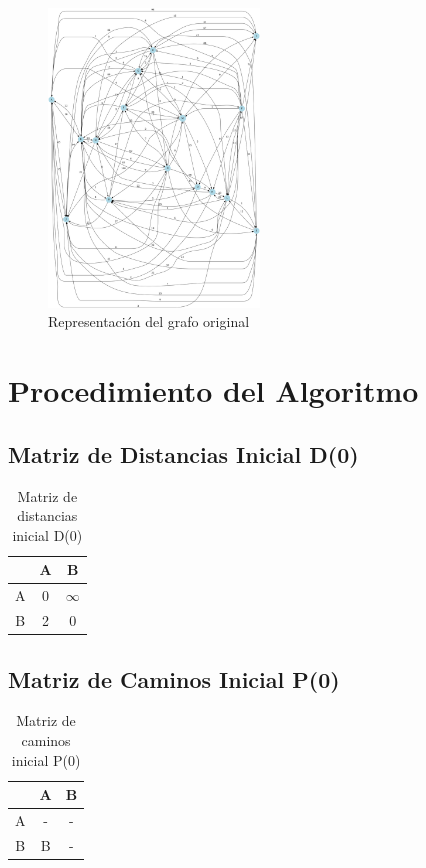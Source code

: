 \documentclass[12pt]{article}
\begin{document}
\begin{figure}[h!]
\centering
\includegraphics[width=0.5\textwidth,keepaspectratio]{grafo.png}
\caption{Representación del grafo original}
\end{figure}

\clearpage
\section{Procedimiento del Algoritmo}
\subsection{Matriz de Distancias Inicial D(0)}
\begin{table}[h!]
\centering
\begin{tabular}{|c|c|c|}
\hline
 & A & B \\\hline
A & 0 & $\infty$ \\\hline
B & 2 & 0 \\\hline
\end{tabular}
\caption{Matriz de distancias inicial D(0)}
\end{table}

\clearpage
\subsection{Matriz de Caminos Inicial P(0)}
\begin{table}[h!]
\centering
\begin{tabular}{|c|c|c|}
\hline
 & A & B \\\hline
A & - & - \\\hline
B & B & - \\\hline
\end{tabular}
\caption{Matriz de caminos inicial P(0)}
\end{table}
\end{document}
